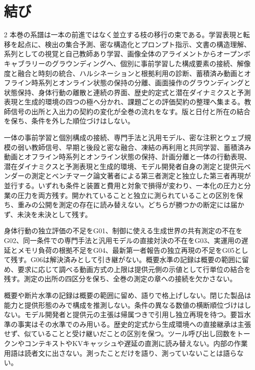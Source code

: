 \documentclass[lualatex,a4paper,10pt]{jlreq}
\begin{document}
\Needspace{0.20\textheight}
\section{結び}
\label{sec:synthesis}
\begin{multicols}{2}
\raggedcolumns
\noindent 本巻の系譜は一本の前進ではなく並立する枝の移行の束である。学習表現と転移を起点に、検出の集合予測、密な構造化とプロンプト指示、文書の構造理解、系列としての視覚と自己教師あり学習、画像全体のアライメントからオープンボキャブラリーのグラウンディングへ、個別に事前学習した構成要素の接続、解像度と融合と時刻の統合、ハルシネーションと根拠利用の診断、蓄積済み動画とオフライン時系列とオンライン状態の保持の分離、画面操作のグラウンディングと状態保持、身体行動の離散と連続の界面、歴史的定式と潜在ダイナミクスと予測表現と生成的環境の四つの極へ分かれ、課題ごとの評価契約の整理へ集まる。教師信号の出所と入出力の契約の変化が全巻の流れをなす。版と日付と所在の結合を保ち、条件を外した順位づけはしない。\par\medskip
\noindent 一体の事前学習と個別構成の接続、専門手法と汎用モデル、密な注釈とウェブ規模の弱い教師信号、早期と後段と密な融合、凍結の再利用と共同学習、蓄積済み動画とオフライン時系列とオンライン状態の保持、計画分離と一体の行動表現、潜在ダイナミクスと予測表現と生成的環境、モデル開発者自身の測定と提供元ベンダーの測定とベンチマーク論文著者による第三者測定と独立した第三者再現が並行する。いずれも条件と装置と費用と対象で損得が変わり、一本化の圧力と分業の圧力を両方残す。開かれていることと独立に測られていることの区別を保ち、重みの公開を測定の存在に読み替えない。どちらが勝つかの断定には届かず、未決を未決として残す。\par\medskip
\noindent 身体行動の独立評価の不足をG01、制御に使える生成世界の共有測定の不在をG02、同一条件での専門手法と汎用モデルの直接対決の不在をG03、実運用の遅延とメモリ負荷の根拠不足をG04、最新第一者報告の独立再現の不足をG05として残す。G06は解決済みとして引き継がない。概要水準の記録は概要の範囲に留め、要求に応じて調べる動画方式の上限は提供元側の示値として行単位の結合を残す。測定の出所の四区分を保ち、全巻の測定の章への接続を欠かさない。\par\medskip
\noindent 概要や断片水準の記録は概要の範囲に留め、語りで格上げしない。閉じた製品は能力と提供形態のみで構成を推測しない。条件の異なる数値の横断順位づけはしない。モデル開発者と提供元の主張は帰属つきで引用し独立再現を待つ。要旨水準の事実はその水準でのみ用いる。歴史的定式から生成環境への直接継承は主張せず、似ていることと受け継いだことの区別を保つ。ツール呼び出し回数をトークンやコンテキストやKVキャッシュや遅延の直測に読み替えない。内部の作業用語は読者文に出さない。測ったことだけを語り、測っていないことは語らない。\par\medskip
\end{multicols}

\clearpage
\onecolumn
\printbibliography[title={References}]
\end{document}
